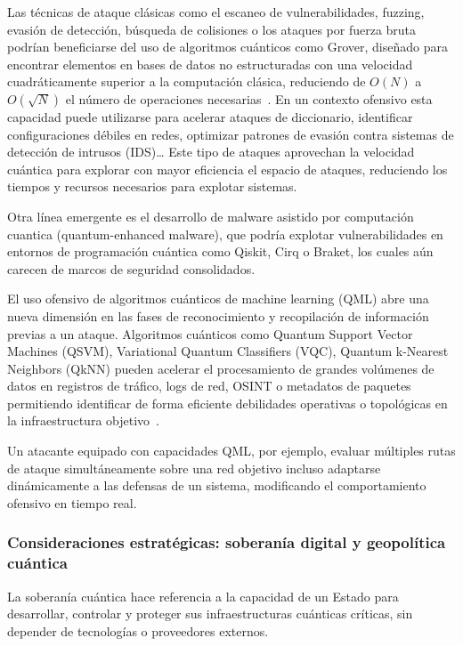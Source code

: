 Las técnicas de ataque clásicas como el escaneo de vulnerabilidades, fuzzing, evasión de detección, búsqueda de colisiones o los ataques por fuerza bruta podrían beneficiarse del uso de algoritmos cuánticos como Grover, diseñado para encontrar elementos en bases de datos no estructuradas con una velocidad cuadráticamente superior a la computación clásica, reduciendo de $O(N)$ a $O(\sqrt{N})$ el número de operaciones necesarias~\cite{Grover1996}. En un contexto ofensivo esta capacidad puede utilizarse para acelerar ataques de diccionario, identificar configuraciones débiles en redes, optimizar patrones de evasión contra sistemas de detección de intrusos (IDS)…
Este tipo de ataques aprovechan la velocidad cuántica para explorar con mayor eficiencia el espacio de ataques, reduciendo los tiempos y recursos necesarios para explotar sistemas.

Otra línea emergente es el desarrollo de malware asistido por computación cuantica (quantum-enhanced malware), que podría explotar vulnerabilidades en entornos de programación cuántica como Qiskit, Cirq o Braket, los cuales aún carecen de marcos de seguridad consolidados.

El uso ofensivo de algoritmos cuánticos de machine learning (QML)  abre una nueva dimensión en las fases de reconocimiento y recopilación de información previas a un ataque. Algoritmos cuánticos como Quantum Support Vector Machines (QSVM), Variational Quantum Classifiers (VQC), Quantum k-Nearest Neighbors (QkNN) pueden acelerar el procesamiento de grandes volúmenes de datos en registros de tráfico, logs de red, OSINT o metadatos de paquetes permitiendo identificar de forma eficiente debilidades operativas o topológicas en la infraestructura objetivo~\cite{Biamonte2016}. 

Un atacante equipado con capacidades QML, por ejemplo, evaluar múltiples rutas de ataque simultáneamente sobre una red objetivo incluso adaptarse dinámicamente a las defensas de un sistema, modificando el comportamiento ofensivo en tiempo real.

\subsubsection {Consideraciones estratégicas: soberanía digital y geopolítica cuántica}

La soberanía cuántica hace referencia a la capacidad de un Estado para desarrollar, controlar y proteger sus infraestructuras cuánticas críticas, sin depender de tecnologías o proveedores externos. 
	
